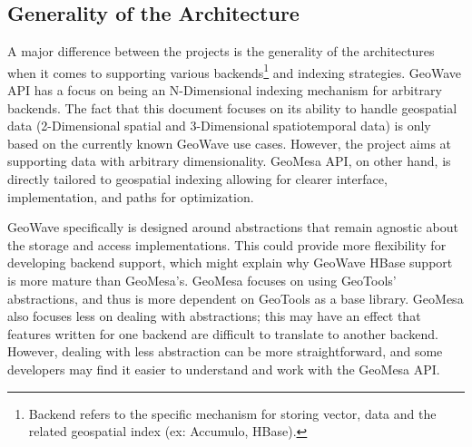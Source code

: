 \subsection{Generality of the Architecture}
\label{sec:featurecompare:generality}

A major difference between the projects is the generality of the architectures when it comes to supporting
various backends\footnote{Backend refers to the specific mechanism for storing vector, data and the related geospatial index (ex: Accumulo, HBase).}
and indexing strategies.
GeoWave API has a focus on being an N-Dimensional indexing mechanism for arbitrary backends.
The fact that this document focuses on its ability to handle geospatial data (2-Dimensional spatial and 3-Dimensional spatiotemporal data) is only based on the currently known GeoWave use cases.
However, the project aims at supporting data with arbitrary dimensionality.
GeoMesa API, on other hand, is directly tailored to geospatial indexing allowing for clearer interface, implementation, and paths for optimization.

GeoWave specifically is designed around abstractions that remain agnostic about the storage and access implementations.
This could provide more flexibility for developing backend support, which might explain why GeoWave HBase support is more mature than GeoMesa's.
GeoMesa focuses on using GeoTools' abstractions, and thus is more dependent on GeoTools as a base library.
GeoMesa also focuses less on dealing with abstractions; this may have an effect that features written for one backend are difficult to translate to another backend.
However, dealing with less abstraction can be more straightforward, and some developers may find it easier to understand and work with the GeoMesa API.
